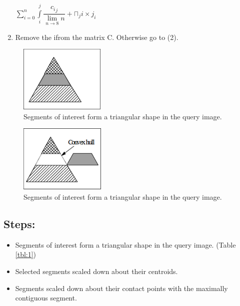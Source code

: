 \documentclass{acmart}
\begin{document}
\begin{enumerate}
\begin{center}
        $\sum\limits_{i=0}^n \int\limits_i^j \dfrac{{c_i}_j}{\lim\limits_{n \to 8}n} + \sqcap{_j}i \times j_i
    $
    \end{center} 
    \item Remove the ifrom the matrix C.  Otherwise go to (2).
\end{enumerate}
\begin{figure}
    \begin{center}
    \centering
    \includegraphics{1.png}
    \caption{Segments of interest form a triangular shape in the query image.}
    \label{fig:1}
    \end{center}
\end{figure}

\begin{figure}
    \begin{center}
    \centering
    \includegraphics{2.png}
    \caption{Segments of interest form a triangular shape in the query image.}
    \label{fig:2}
    \end{center}
\end{figure}



\subsection*{Steps:}
\begin{itemize}
    \item 	Segments of interest form a triangular shape in the query image. (Table \ref{tbl:1})
    \item 	Selected segments scaled down about their centroids.
    \item 	Segments scaled down about their contact points with the maximally contiguous segment.
\end{itemize}
\end{document}
